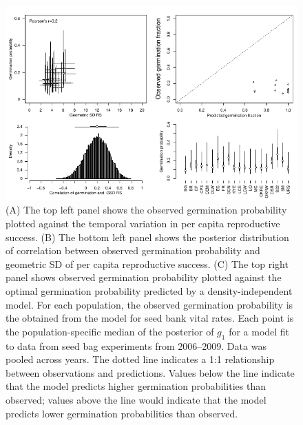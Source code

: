 \documentclass[12pt, oneside, titlepage]{article}   	%
\begin{document}
{ \begin{figure}
\centering
       \includegraphics[page=1,width=1\textwidth]{../manuscript/figures/analysis-figure.pdf}  
 \caption{ (A) The top left panel shows the observed germination probability plotted against the temporal variation in per capita reproductive success. (B) The bottom left panel shows the posterior distribution of correlation between observed germination probability and geometric SD of per capita reproductive success. (C) The top right panel shows observed germination probability plotted against the optimal germination probability predicted by a density-independent model. For each population, the observed germination probability is the obtained from the model for seed bank vital rates. Each point is the population-specific median of the posterior of $g_1$ for a model fit to data from seed bag experiments from 2006--2009. Data was pooled across years. The dotted line indicates a 1:1 relationship between observations and predictions. Values below the line indicate that the model predicts higher germination probabilities than observed; values above the line would indicate that the model predicts lower germination probabilities than observed. }
   \label{fig:obs-pred}
 \end{figure}
 
}
\end{document}
